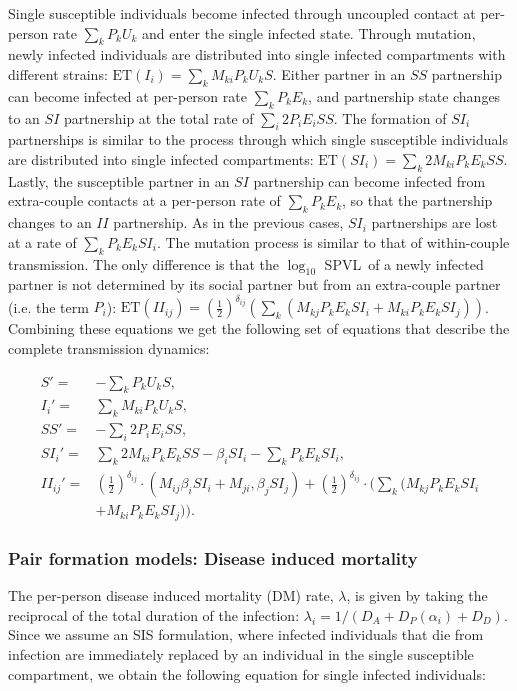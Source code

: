 \documentclass[10pt,letterpaper]{article}
\newcommand{\khalf}{\left(\frac{1}{2}\right)^{\delta_{ij}}}  %
\newcommand{\Lspvl}{$\log_{10}$ SPVL}
\newcommand{\ET}{\textrm{ET}}
\begin{document}
Single susceptible individuals become infected through uncoupled contact at per-person rate $\sum_k P_k U_k$ and enter the single infected state. Through mutation, newly infected individuals are distributed into single infected compartments with different strains: $\ET(I_i) = \sum_k M_{ki} P_k U_k S$. Either partner in an $SS$ partnership can become infected at per-person rate $\sum_k P_k E_k$, and partnership state changes to an $SI$ partnership at the total rate of $\sum_i 2 P_i E_i SS$. The formation of $SI_i$ partnerships is similar to the process through which single susceptible individuals are distributed into single infected compartments: $\ET(SI_i) = \sum_k 2 M_{ki} P_k E_k SS$. Lastly, the susceptible partner in an $SI$ partnership can become infected from extra-couple contacts at a per-person rate of $\sum_k P_k E_k$, so that the partnership changes to an $II$ partnership. As in the previous cases, $SI_i$ partnerships are lost at a rate of $\sum_k P_k E_k SI_i$. The mutation process is similar to that of within-couple transmission. The only difference is that the \Lspvl\ of a newly infected partner is not determined by its social partner but from an extra-couple partner (i.e. the term $P_i$): $\ET(II_{ij}) = (\frac{1}{2})^{\delta_{ij}}(\sum_k (M_{kj} P_k E_k SI_i + M_{ki} P_k E_k SI_j))$. Combining these equations we get the following set of equations that describe the complete transmission dynamics:

\begin{equation}
\begin{aligned}
S' =& - \sum_k P_k U_k S,\\
I_i' =& \sum_k M_{ki} P_k U_k S,\\
SS' =&  - \sum_i 2 P_i E_i SS, \\
SI_i' =& \sum_k 2 M_{ki} P_k E_k SS - \beta_i SI_i - \sum_k P_k E_k SI_i,\\
II_{ij}' =& \khalf \cdot (M_{ij} \beta_i SI_i + M_{ji}, \beta_j SI_j) + \khalf \cdot (\sum_k (M_{kj} P_k E_k SI_i\\
&+ M_{ki} P_k E_k SI_j)).
\end{aligned}
\end{equation}

\subsubsection*{Pair formation models: Disease induced mortality}

The per-person disease induced mortality (DM) rate, $\lambda$, is given by taking the reciprocal of the total duration of the infection: $\lambda_i = 1/(D_A + D_P(\alpha_i) + D_D)$. Since we assume an SIS formulation, where infected individuals that die from infection are immediately replaced by an individual in the single susceptible compartment, we obtain the following equation for single infected individuals:
\end{document}
